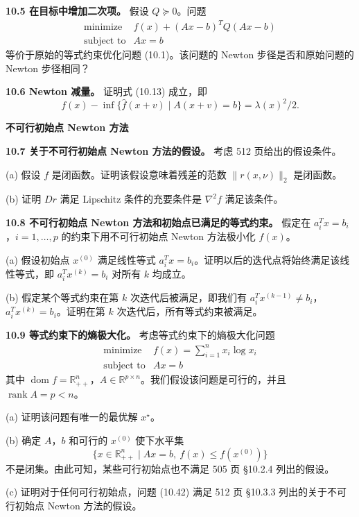 \documentclass[UTF8,12pt,a4paper,fontset=fandol]{ctexart}
\begin{document}
\noindent\textbf{10.5 在目标中增加二次项。}\quad
假设 $Q\succeq0$。问题
\[
\begin{array}{ll}
\mbox{minimize} & f(x)+(Ax-b)^TQ(Ax-b)\\
\mbox{subject to} & Ax=b
\end{array}
\]
等价于原始的等式约束优化问题 (10.1)。该问题的 Newton 步径是否和原始问题的 Newton 步径相同？

\noindent\textbf{10.6 Newton 减量。}\quad
证明式 (10.13) 成立，即
\[
f(x)-\inf\{\hat f(x+v)\mid A(x+v)=b\}=\lambda(x)^2/2.
\]

\noindent\textbf{不可行初始点 Newton 方法}

\noindent\textbf{10.7 关于不可行初始点 Newton 方法的假设。}\quad
考虑 512 页给出的假设条件。

(a) 假设 $f$ 是闭函数。证明该假设意味着残差的范数 $\|r(x,\nu)\|_2$ 是闭函数。

(b) 证明 $Dr$ 满足 Lipschitz 条件的充要条件是 $\nabla^2 f$ 满足该条件。

\noindent\textbf{10.8 不可行初始点 Newton 方法和初始点已满足的等式约束。}\quad
假定在 $a_i^Tx=b_i$，$i=1,\ldots,p$ 的约束下用不可行初始点 Newton 方法极小化 $f(x)$。

(a) 假设初始点 $x^{(0)}$ 满足线性等式 $a_i^Tx=b_i$。证明以后的迭代点将始终满足该线性等式，即 $a_i^Tx^{(k)}=b_i$ 对所有 $k$ 均成立。

(b) 假定某个等式约束在第 $k$ 次迭代后被满足，即我们有 $a_i^Tx^{(k-1)}\neq b_i$，$a_i^Tx^{(k)}=b_i$。证明在第 $k$ 次迭代后，所有等式约束被满足。

\noindent\textbf{10.9 等式约束下的熵极大化。}\quad
考虑等式约束下的熵极大化问题
\begin{equation}
\begin{array}{ll}
\mbox{minimize} & f(x)=\displaystyle\sum_{i=1}^n x_i\log x_i\\
\mbox{subject to} & Ax=b
\end{array}
\tag{10.42}
\end{equation}
其中 $\operatorname{dom} f=\mathbb{R}_{++}^n$，$A\in\mathbb{R}^{p\times n}$。我们假设该问题是可行的，并且 $\operatorname{rank}A=p<n$。

(a) 证明该问题有唯一的最优解 $x^\star$。

(b) 确定 $A$，$b$ 和可行的 $x^{(0)}$ 使下水平集
\[
\{x\in\mathbb{R}_{++}^n\mid Ax=b,\ f(x)\leq f(x^{(0)})\}
\]
不是闭集。由此可知，某些可行初始点也不满足 505 页 \S10.2.4 列出的假设。

(c) 证明对于任何可行初始点，问题 (10.42) 满足 512 页 \S10.3.3 列出的关于不可行初始点 Newton 方法的假设。
\end{document}
